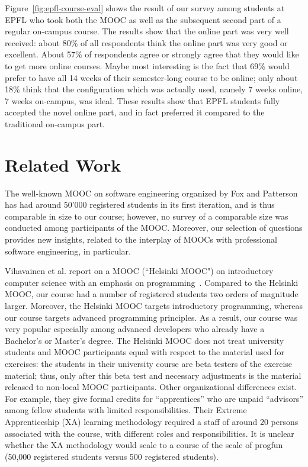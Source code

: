 \documentclass{sig-alternate}
\begin{document}
Figure~\ref{fig:epfl-course-eval} shows the result of our survey among
students at EPFL who took both the MOOC as well as the subsequent second part
of a regular on-campus course. The results show that the online part was very
well received: about 80\% of all respondents think the online part was very
good or excellent. About 57\% of respondents agree or strongly agree that they
would like to get more online courses. Maybe most interesting is the fact that
69\% would prefer to have all 14 weeks of their semester-long course to be
online; only about 18\% think that the configuration which was actually used,
namely 7 weeks online, 7 weeks on-campus, was ideal. These results show that
EPFL students fully accepted the novel online part, and in fact preferred it
compared to the traditional on-campus part.


\section{Related Work}
\label{sec:related-work}

The well-known MOOC on software engineering organized by Fox and
Patterson~\cite{FoxP12} has had around 50'000 registered students in its first
iteration, and is thus comparable in size to our course; however, no survey of
a comparable size was conducted among participants of the MOOC. Moreover, our
selection of questions provides new insights, related to the interplay of
MOOCs with professional software engineering, in particular.

Vihavainen et al. report on a MOOC (``Helsinki MOOC") on introductory computer
science with an emphasis on programming~\cite{VihavainenLK12}. Compared to the
Helsinki MOOC, our course had a number of registered students two orders of
magnitude larger. Moreover, the Helsinki MOOC targets introductory
programming, whereas our course targets advanced programming principles. As a
result, our course was very popular especially among advanced developers who
already have a Bachelor's or Master's degree. The Helsinki MOOC does not treat
university students and MOOC participants equal with respect to the material
used for exercises: the students in their university course are beta testers
of the exercise material; thus, only after this beta test and necessary
adjustments is the material released to non-local MOOC participants. Other
organizational differences exist. For example, they give formal credits for
``apprentices'' who are unpaid ``advisors'' among fellow students with limited
responsibilities. Their Extreme Apprenticeship (XA) learning methodology
required a staff of around 20 persons associated with the course, with
different roles and responsibilities. It is unclear whether the XA methodology
would scale to a course of the scale of progfun (50,000 registered students
versus 500 registered students).
\end{document}
